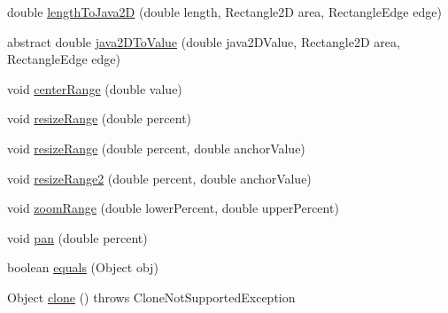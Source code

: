 \begin{DoxyCompactItemize}
\item 
double \mbox{\hyperlink{classorg_1_1jfree_1_1chart_1_1axis_1_1_value_axis_a4bf737663016e2c69df21cb2b88e0798}{length\+To\+Java2D}} (double length, Rectangle2D area, Rectangle\+Edge edge)
\item 
abstract double \mbox{\hyperlink{classorg_1_1jfree_1_1chart_1_1axis_1_1_value_axis_ae06f616d1aea4723ac068cba20e9347f}{java2\+D\+To\+Value}} (double java2\+D\+Value, Rectangle2D area, Rectangle\+Edge edge)
\item 
void \mbox{\hyperlink{classorg_1_1jfree_1_1chart_1_1axis_1_1_value_axis_a3dc18dbd94d3b3896960ea5a9714d3aa}{center\+Range}} (double value)
\item 
void \mbox{\hyperlink{classorg_1_1jfree_1_1chart_1_1axis_1_1_value_axis_a72029be0ff09e06486afc057309fa222}{resize\+Range}} (double percent)
\item 
void \mbox{\hyperlink{classorg_1_1jfree_1_1chart_1_1axis_1_1_value_axis_aa07f9611f6938490b51fbfe65fa55400}{resize\+Range}} (double percent, double anchor\+Value)
\item 
void \mbox{\hyperlink{classorg_1_1jfree_1_1chart_1_1axis_1_1_value_axis_aca7376f82e581b94bd2887e32e043bb1}{resize\+Range2}} (double percent, double anchor\+Value)
\item 
void \mbox{\hyperlink{classorg_1_1jfree_1_1chart_1_1axis_1_1_value_axis_aebcbc502256b4460ae2f2f9d231e6435}{zoom\+Range}} (double lower\+Percent, double upper\+Percent)
\item 
void \mbox{\hyperlink{classorg_1_1jfree_1_1chart_1_1axis_1_1_value_axis_a58a1261f7c34875d01cae4deebac7ddc}{pan}} (double percent)
\item 
boolean \mbox{\hyperlink{classorg_1_1jfree_1_1chart_1_1axis_1_1_value_axis_a6f926d2ebfa4b4da25eef0179cc3d6f8}{equals}} (Object obj)
\item 
Object \mbox{\hyperlink{classorg_1_1jfree_1_1chart_1_1axis_1_1_value_axis_ac4c17d8abb9d194a36e0ea32a6249e80}{clone}} ()  throws Clone\+Not\+Supported\+Exception 
\end{DoxyCompactItemize}
